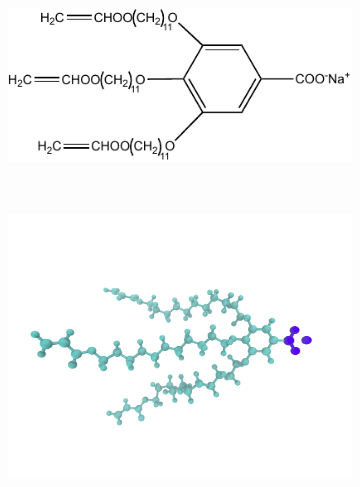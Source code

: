 \documentclass[journal=jpcbfk,manuscript=article]{achemso}
\begin{document}
  \begin{figure}
	\centering
	\begin{subfigure}{.3\textwidth}
		\centering
		\includegraphics[width=\textwidth]{NaGA3C11.pdf}
		\caption{}~\label{fig:monomer}
	\end{subfigure}
	\begin{subfigure}{.3\textwidth}
		\centering
		\includegraphics[width=\textwidth]{monomer_twocolor.pdf}
		\caption{}~\label{fig:atomistic_monomer}
	\end{subfigure}
	\begin{subfigure}{0.3\linewidth}
		\centering

\end{subfigure}
\end{figure}
\end{document}
